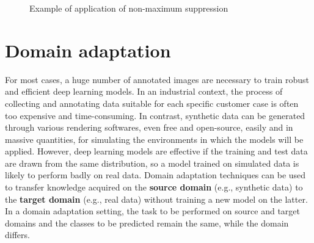\documentclass[%
    corpo=12pt,
    twoside,
    stile=classica,   
    tipotesi=magistrale,
    evenboxes,
    english
]{toptesi}
\begin{document}
\begin{figure}[ht]
	\centering
	\caption{Example of application of non-maximum suppression}
	\label{fig:nms}
\end{figure}


\section{Domain adaptation}


For most cases, a huge number of annotated images are necessary to train robust and efficient deep learning models. In an industrial context, the process of collecting and annotating data suitable for each specific customer case is often too expensive and time-consuming. In contrast, synthetic data can be generated through various rendering softwares, even free and open-source, easily and in massive quantities, for simulating the environments in which the models will be applied. However, deep learning models are effective if the training and test data are drawn from the same distribution, so a model trained on simulated data is likely to perform badly on real data. Domain adaptation techniques can be used to transfer knowledge acquired on the \textbf{source domain} (e.g., synthetic data) to the \textbf{target domain} (e.g., real data) without training a new model on the latter. In a domain adaptation setting, the task to be performed on source and target domains and the classes to be predicted remain the same, while the domain differs.
\end{document}
